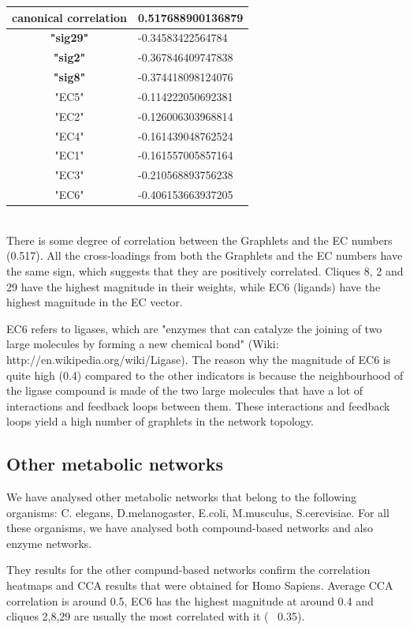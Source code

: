 \documentclass[11pt,a4paper,oneside]{report}
\begin{document}
\begin{tabular}{ c | l }
canonical correlation & 0.517688900136879\\
\hline
\textbf{"sig29"} & -0.34583422564784\\
\textbf{"sig2"} & -0.367846409747838\\
\textbf{"sig8"} & -0.374418098124076\\
\hline
"EC5" & -0.114222050692381\\
"EC2" & -0.126006303968814\\
"EC4" & -0.161439048762524\\
"EC1" & -0.161557005857164\\
"EC3" & -0.210568893756238\\
"EC6" & -0.406153663937205\\
\end{tabular}\\


There is some degree of correlation between the Graphlets and the EC numbers (0.517). All the cross-loadings from both the Graphlets and the EC numbers have the same sign, which suggests that they are positively correlated. Cliques 8, 2 and 29 have the highest magnitude in their weights, while EC6 (ligands) have the highest magnitude in the EC vector. 

EC6 refers to ligases, which are "enzymes that can catalyze the joining of two large molecules by forming a new chemical bond" (Wiki: http://en.wikipedia.org/wiki/Ligase). The reason why the magnitude of EC6 is quite high (0.4) compared to the other indicators is because the neighbourhood of the ligase compound is made of the two large molecules that have a lot of interactions and feedback loops between them. These interactions and feedback loops yield a high number of graphlets in the network topology.


\subsection*{Other metabolic networks}

We have analysed other metabolic networks that belong to the following organisms: C. elegans, D.melanogaster, E.coli, M.musculus, S.cerevisiae. For all these organisms, we have analysed both compound-based networks and also enzyme networks.

They results for the other compund-based networks confirm the correlation heatmaps and CCA results that were obtained for Homo Sapiens. Average CCA correlation is around 0.5, EC6 has the highest magnitude at around 0.4 and cliques 2,8,29 are usually the most correlated with it (~ 0.35).
\end{document}
